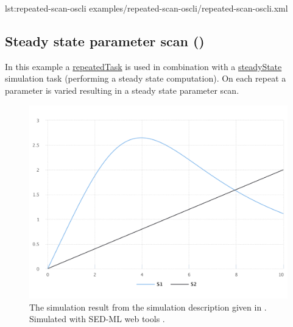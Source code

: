 {lst:repeated-scan-oscli}
{examples/repeated-scan-oscli/repeated-scan-oscli.xml}

\subsection{Steady state parameter scan ()}
In this example a \hyperref[class:repeatedTask]{repeatedTask} is used in combination with a \hyperref[class:steadyState]{steadyState} simulation task (performing a steady state computation). On each repeat a parameter is varied resulting in a steady state parameter scan.

\begin{figure}[ht]
    \centering
    \begin{minipage}{0.47\textwidth}
        \centering
        \includegraphics[width=1.0\textwidth]{examples/repeated-steady-scan-oscli/results/sedml_webtools/plot1}
        \caption{The simulation result from the simulation description given in . Simulated with SED-ML web tools \citep{bergmann2017sed}.}
    \end{minipage}\hfill
    \begin{minipage}{0.47\textwidth}
        \centering

\end{minipage}
\end{figure}
